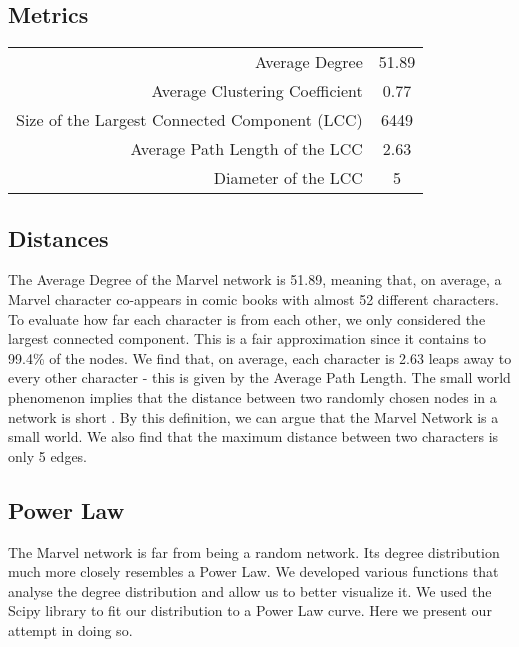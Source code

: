 \documentclass[a4paper]{article}
\begin{document}
\subsection{Metrics}
\begin{center}
\begin{tabular}{ r | c }
 Average Degree & 51.89 \\[5pt]
 Average Clustering Coefficient & 0.77\\[5pt]
 Size of the Largest Connected Component (LCC) & 6449 \\[5pt]
 Average Path Length of the LCC & 2.63 \\[5pt]
 Diameter of the LCC & 5 \\[5pt]
 
\end{tabular}
\end{center}
\subsection{Distances}
The Average Degree of the Marvel network is 51.89, meaning that, on average, a Marvel character co-appears in comic books with almost 52 different characters. 
To evaluate how far each character is from each other, we only considered the largest connected component. This is a fair approximation since it contains to 99.4\% of the nodes. We find that, on average, each character is 2.63 leaps away to every other character - this is given by the Average Path Length. The small world phenomenon implies that the distance between two randomly chosen nodes in a network is short \cite{Network Science}. By this definition, we can argue that the Marvel Network is a small world. We also find that the maximum distance between two characters is only 5 edges. 

\subsection{Power Law}
The Marvel network is far from being a random network. Its degree distribution much more closely resembles a Power Law. We developed various functions that analyse the degree distribution and allow us to better visualize it. We used the Scipy library to fit our distribution to a Power Law curve. Here we present our attempt in doing so.
\end{document}
